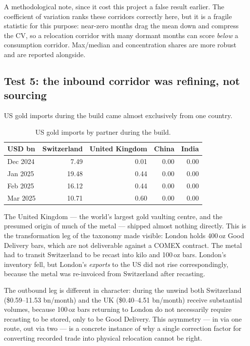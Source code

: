 \documentclass[11pt,a4paper]{article}
\begin{document}
A methodological note, since it cost this project a false result earlier. The coefficient of
variation ranks these corridors correctly here, but it is a fragile statistic for this purpose:
near-zero months drag the mean down and compress the CV, so a relocation corridor with many
dormant months can score \emph{below} a consumption corridor. Max/median and concentration
shares are more robust and are reported alongside.

\subsection{Test 5: the inbound corridor was refining, not sourcing}

US gold imports during the build came almost exclusively from one country.

\begin{table}[h]
\centering
\begin{tabular}{@{}lrrrr@{}}
\toprule
\textbf{USD bn} & \textbf{Switzerland} & \textbf{United Kingdom} & \textbf{China} &
\textbf{India} \\
\midrule
Dec 2024 & 7.49 & 0.01 & 0.00 & 0.00 \\
Jan 2025 & 19.48 & 0.44 & 0.00 & 0.00 \\
Feb 2025 & 16.12 & 0.44 & 0.00 & 0.00 \\
Mar 2025 & 10.71 & 0.60 & 0.00 & 0.00 \\
\bottomrule
\end{tabular}
\caption{US gold imports by partner during the build.}
\end{table}

The United Kingdom --- the world's largest gold vaulting centre, and the presumed origin of
much of the metal --- shipped almost nothing directly. This is the transformation leg of the
taxonomy made visible: London holds 400\,oz Good Delivery bars, which are not deliverable
against a COMEX contract. The metal had to transit Switzerland to be recast into kilo and
100\,oz bars. London's inventory fell, but London's \emph{exports} to the US did not rise
correspondingly, because the metal was re-invoiced from Switzerland after recasting.

The outbound leg is different in character: during the unwind both Switzerland (\$0.59--11.53
bn/month) and the UK (\$0.40--4.51 bn/month) receive substantial volumes, because 100\,oz bars
returning to London do not necessarily require recasting to be stored, only to be Good Delivery.
This asymmetry --- in via one route, out via two --- is a concrete instance of why a single
correction factor for converting recorded trade into physical relocation cannot be right.
\end{document}

